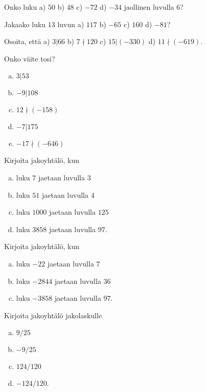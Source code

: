 \begin{tehtavasivu}

\begin{tehtava}
	Onko luku a) $50$ b) $48$ c) $-72$ d) $-34$ jaollinen luvulla $6$?
\end{tehtava}

\begin{tehtava}
	Jakaako luku $13$ luvun a) $117$ b) $-65$ c) $160$ d) $-81$?
\end{tehtava}

\begin{tehtava}
	Osoita, että a) $3|66$ b) $7\nmid 120$ c) $15|(-330)$ d) $11\nmid (-619)$.
\end{tehtava}

\begin{tehtava}
	Onko väite tosi?
	\begin{enumerate}[a)]
	\item $3|53$
	\item $-9|108$
	\item $12 \nmid (-158)$
	\item $-7|175$
	\item $-17 \nmid (-646)$
	\end{enumerate}
\end{tehtava}

\begin{tehtava}
	Kirjoita jakoyhtälö, kun
	\begin{enumerate}[a)]
	\item luku $7$ jaetaan luvulla $3$
	\item luku $51$ jaetaan luvulla $4$
	\item luku $1000$ jaetaan luvulla $125$
	\item luku $3858$ jaetaan luvulla $97$.
	\end{enumerate}
\end{tehtava}

\begin{tehtava}
	Kirjoita jakoyhtälö, kun
	\begin{enumerate}[a)]
	\item luku $-22$ jaetaan luvulla $7$
	\item luku $-2844$ jaetaan luvulla $36$
	\item luku $-3858$ jaetaan luvulla $97$.
	\end{enumerate}
\end{tehtava}

\begin{tehtava}
	Kirjoita jakoyhtälö jakolaskulle
	\begin{enumerate}[a)]
	\item $9/25$
	\item $-9/25$
	\item $124/120$
	\item $-124/120$.
	\end{enumerate}
\end{tehtava}


\end{tehtavasivu}
